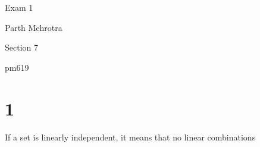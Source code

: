 \documentclass{article}
\begin{document}
\centerline{\sc \large Exam 1}
\vspace{0.5pc}
\centerline{Parth Mehrotra}
\centerline{Section 7}
\centerline{pm619}

\section*{1}
If a set is linearly independent, it means that no linear combinations 
\end{document}
